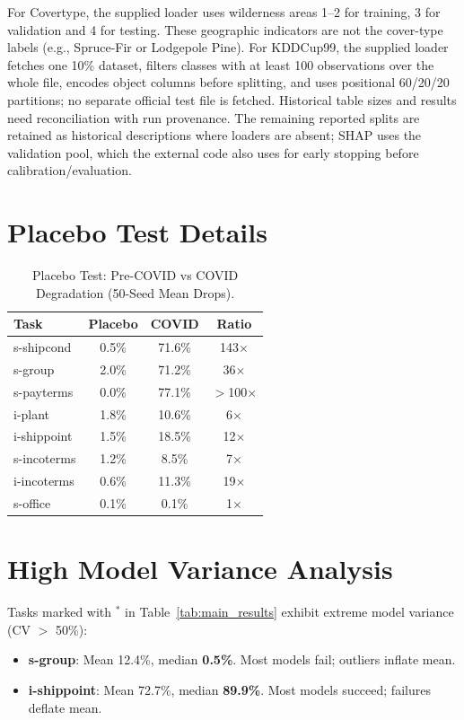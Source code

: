 \documentclass[accepted]{uai2026} %
\begin{document}
\begin{table}[htbp]
\raggedright
\footnotesize
For Covertype, the supplied loader uses wilderness areas 1--2 for training, 3 for validation and 4 for testing. These geographic indicators are not the cover-type labels (e.g., Spruce-Fir or Lodgepole Pine). For KDDCup99, the supplied loader fetches one 10\% dataset, filters classes with at least 100 observations over the whole file, encodes object columns before splitting, and uses positional 60/20/20 partitions; no separate official test file is fetched. Historical table sizes and results need reconciliation with run provenance. The remaining reported splits are retained as historical descriptions where loaders are absent; SHAP uses the validation pool, which the external code also uses for early stopping before calibration/evaluation.
\end{table}

\section{Placebo Test Details}\label{app:placebo}

\begin{table}[htbp]
\centering
\caption{Placebo Test: Pre-COVID vs COVID Degradation (50-Seed Mean Drops).}\label{tab:placebo}
\begin{tabular}{lccc}
\toprule
Task & Placebo & COVID & Ratio \\
\midrule
s-shipcond & 0.5\% & 71.6\% & 143$\times$ \\
s-group & 2.0\% & 71.2\% & 36$\times$ \\
s-payterms & 0.0\% & 77.1\% & $>$100$\times$ \\
i-plant & 1.8\% & 10.6\% & 6$\times$ \\
i-shippoint & 1.5\% & 18.5\% & 12$\times$ \\
s-incoterms & 1.2\% & 8.5\% & 7$\times$ \\
i-incoterms & 0.6\% & 11.3\% & 19$\times$ \\
s-office & 0.1\% & 0.1\% & 1$\times$ \\
\bottomrule
\end{tabular}
\end{table}

\section{High Model Variance Analysis}\label{app:variance}

Tasks marked with $^*$ in Table~\ref{tab:main_results} exhibit extreme model variance (CV $>$ 50\%):
\begin{itemize}
    \item \textbf{s-group}: Mean 12.4\%, median \textbf{0.5\%}. Most models fail; outliers inflate mean.
    \item \textbf{i-shippoint}: Mean 72.7\%, median \textbf{89.9\%}. Most models succeed; failures deflate mean.
\end{itemize}
\end{document}
